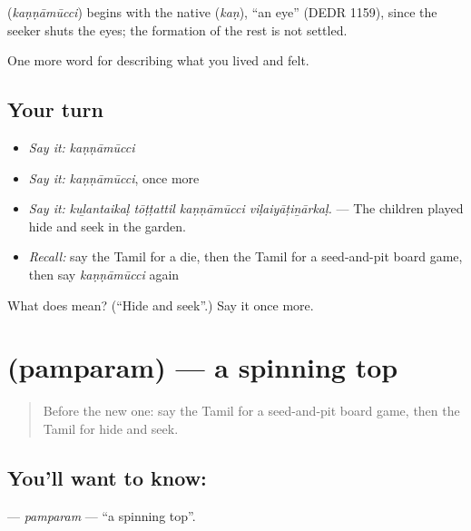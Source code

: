 \begin{cousinweb}
\textbf{} (\emph{kaṇṇāmūcci}) begins with the native  (\emph{kaṇ}), \textquotedblleft{}an eye\textquotedblright{} (DEDR 1159), since the seeker shuts the eyes; the formation of the rest is not settled.
\end{cousinweb}

\begin{grammarlens}[title={What you've built}]
One more word for describing what you lived and felt.
\end{grammarlens}

\subsection*{Your turn}
\begin{itemize}
\raggedright
  \item \emph{Say it:} \emph{kaṇṇāmūcci}
  \item \emph{Say it:} \emph{kaṇṇāmūcci}, once more
  \item \emph{Say it:} \emph{kuḻantaikaḷ tōṭṭattil kaṇṇāmūcci viḷaiyāṭiṉārkaḷ.} — The children played hide and seek in the garden.
  \item \emph{Recall:} say the Tamil for a die, then the Tamil for a seed-and-pit board game, then say \emph{kaṇṇāmūcci} again
\end{itemize}

\begin{tcolorbox}[breakable,colback=teal!4,colframe=teal!35!black,title={Before you move on}]
What does  mean? (\textquotedblleft{}Hide and seek\textquotedblright{}.) Say it once more.
\end{tcolorbox}
\section[\texorpdfstring{\ta{பம்பரம்} (pamparam)}{பம்பரம் (pamparam)}]{ (pamparam) — a spinning top}

\label{lesson:TA-C530-pamparam}



\begin{quote}
Before the new one: say the Tamil for a seed-and-pit board game, then the Tamil for hide and seek.
\end{quote}

\subsection*{You'll want to know: }
\textbf{} — \emph{pamparam} — \textquotedblleft{}a spinning top\textquotedblright{}.

